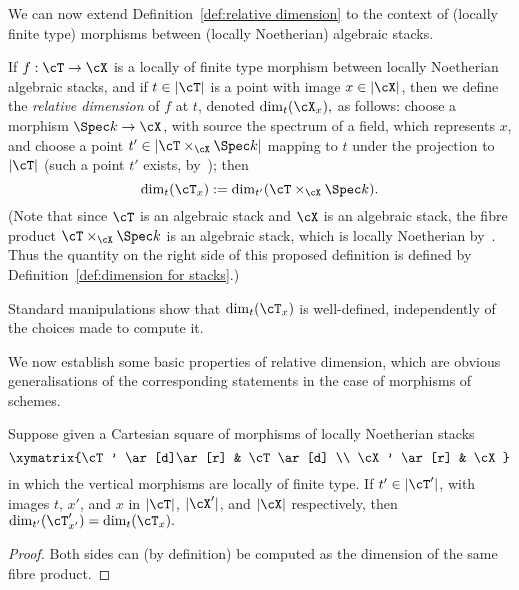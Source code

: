 We can now extend Definition~\ref{def:relative dimension} to the context
of (locally finite type) 
morphisms between (locally Noetherian) algebraic stacks.

\begin{adf}
\label{def:relative dimension for stacks}
If $f:\cT \to \cX$ is a locally of finite type morphism between 
locally Noetherian algebraic stacks,
and if $t \in |\cT|$ is a point with image $x \in | \cX|$, then we define 
the {\em relative dimension} of $f$ at $t$, denoted
$\dim_t(\cX_x),$
as follows: 
choose a morphism $\Spec k \to \cX$, with source the spectrum of 
a field, which represents $x$, and choose a point $t' \in | \cT\times_{\cX}
\Spec k |$ mapping to $t$ under the projection to $|\cT|$
(such a point $t'$ exists,
by~\cite[\href{http://stacks.math.columbia.edu/tag/04XH}{Lem.~04XH}]
{stacks-project}); then
$$\dim_t(\cT_x) := \dim_{t'}(\cT \times_{\cX} \Spec k ).$$
(Note that since $\cT$ is an algebraic stack and $\cX$ is an algebraic
stack, 
the fibre product $\cT\times_{\cX} \Spec k$ is an algebraic stack,
which is locally Noetherian by~\cite[\href{http://stacks.math.columbia.edu/tag/06R6}{Lem.~06R6}]{stacks-project}.
Thus the quantity on the right side of this proposed definition
is defined by Definition~\ref{def:dimension for stacks}.)
\end{adf}

\begin{aremark}
Standard manipulations show that $\dim_t(\cT_x)$ is well-defined,
independently of the choices made to compute it.
\end{aremark}

\bigskip

We now establish some basic properties of relative dimension, which
are obvious generalisations of the corresponding statements in the 
case of morphisms of schemes.

\begin{alemma}
\label{lem:base-change invariance of relative dimension}
Suppose given 
a Cartesian square of morphisms of locally Noetherian stacks
$$\xymatrix{\cT' \ar[d]\ar[r] & \cT \ar[d] \\
\cX' \ar[r] & \cX}$$
in which the vertical morphisms are locally of finite type.
If $t' \in |\cT'|$, 
with images $t$, $x'$, and $x$ in $|\cT|$, $|\cX'|$, and $|\cX|$ 
respectively, then $\dim_{t'}(\cT'_{x'}) = \dim_{t}(\cT_x).$
\end{alemma}
\begin{proof}Both sides can (by definition) be computed as the
  dimension of the same fibre product.
\end{proof}

